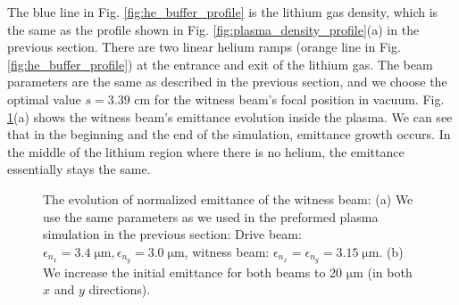 \documentclass[%
reprint, superscriptaddress,
 amsmath,amssymb, aps,
prstab,
]{revtex4-2}
\begin{document}
The blue line in Fig. \ref{fig:he_buffer_profile} is the lithium gas
density, which is the same as the profile shown in
Fig. \ref{fig:plasma_density_profile}(a) in the previous section. There are two
linear helium ramps (orange line in Fig. \ref{fig:he_buffer_profile}) at
the entrance and exit of the lithium gas. The beam parameters are the
same as described in the previous section, and we choose the optimal value
$s=3.39$ cm for the witness beam's focal position in vacuum.
Fig. \ref{fig:he_buffer_emittance_growth}(a) shows the witness beam's
emittance evolution inside the plasma. We can see that in the beginning
and the end of the simulation, emittance growth occurs. In the
middle of the lithium region where there is no helium, the emittance essentially stays the same.
\begin{figure}[htbp] 
        \caption{The evolution of normalized emittance of the witness beam: (a) We use the same
        parameters as we used in the preformed plasma simulation in the
        previous section: Drive beam: $\epsilon_{n_x} = 3.4\; \mathrm{\mu m},
        \epsilon_{n_y} = 3.0\; \mathrm{\mu m}$, witness beam: $\epsilon_{n_x} =
        \epsilon_{n_y} = 3.15\; \mathrm{\mu m}$. (b) We increase the initial
        emittance for both beams to 20 $\mathrm{\mu m}$ (in both $x$ and
        $y$ directions).} \label{fig:he_buffer_emittance_growth}
        \end{figure} 
        
\end{document}
